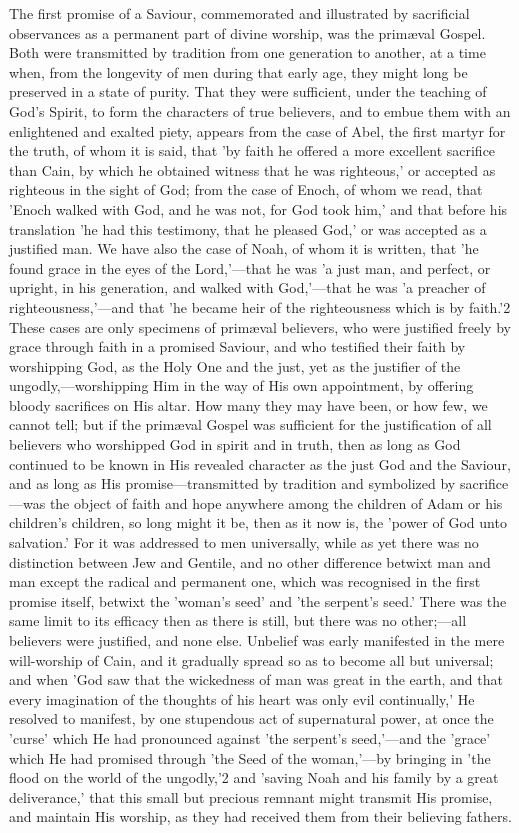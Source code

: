 \documentclass[
]{book}
\begin{document}
The first promise of a Saviour, commemorated and illustrated by sacrificial observances as a permanent part of divine worship, was the primæval Gospel. Both were transmitted by tradition from one generation to another, at a time when, from the longevity of men during that early age, they might long be preserved in a state of purity. That they were sufficient, under the teaching of God's Spirit, to form the characters of true believers, and to embue them with an enlightened and exalted piety, appears from the case of Abel, the first martyr for the truth, of whom it is said, that 'by faith he offered a more excellent sacrifice than Cain, by which he obtained witness that he was righteous,' or accepted as righteous in the sight of God; from the case of Enoch, of whom we read, that 'Enoch walked with God, and he was not, for God took him,' and that before his translation 'he had this testimony, that he pleased God,' or was accepted as a justified man. We have also the case of Noah, of whom it is written, that 'he found grace in the eyes of the Lord,'---that he was 'a just man, and perfect, or upright, in his generation, and walked with God,'---that he was 'a preacher of righteousness,'---and that 'he became heir of the righteousness which is by faith.'2 These cases are only specimens of primæval believers, who were justified freely by grace through faith in a promised Saviour, and who testified their faith by worshipping God, as the Holy One and the just, yet as the justifier of the ungodly,---worshipping Him in the way of His own appointment, by offering bloody sacrifices on His altar. How many they may have been, or how few, we cannot tell; but if the primæval Gospel was sufficient for the justification of all believers who worshipped God in spirit and in truth, then as long as God continued to be known in His revealed character as the just God and the Saviour, and as long as His promise---transmitted by tradition and symbolized by sacrifice---was the object of faith and hope anywhere among the children of Adam or his children's children, so long might it be, then as it now is, the 'power of God unto salvation.' For it was addressed to men universally, while as yet there was no distinction between Jew and Gentile, and no other difference betwixt man and man except the radical and permanent one, which was recognised in the first promise itself, betwixt the 'woman's seed' and 'the serpent's seed.' There was the same limit to its efficacy then as there is still, but there was no other;---all believers were justified, and none else. Unbelief was early manifested in the mere will-worship of Cain, and it gradually spread so as to become all but universal; and when 'God saw that the wickedness of man was great in the earth, and that every imagination of the thoughts of his heart was only evil continually,' He resolved to manifest, by one stupendous act of supernatural power, at once the 'curse' which He had pronounced against 'the serpent's seed,'---and the 'grace' which He had promised through 'the Seed of the woman,'---by bringing in 'the flood on the world of the ungodly,'2 and 'saving Noah and his family by a great deliverance,' that this small but precious remnant might transmit His promise, and maintain His worship, as they had received them from their believing fathers.
\end{document}
